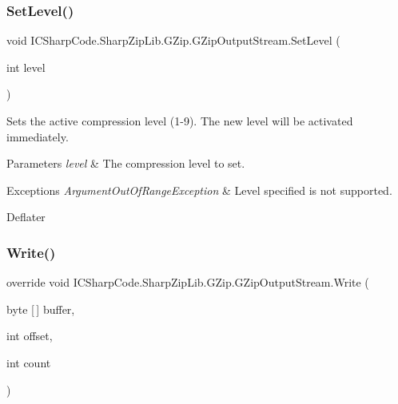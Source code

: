 \subsubsection{\texorpdfstring{Set\+Level()}{SetLevel()}}
{\footnotesize\ttfamily void I\+C\+Sharp\+Code.\+Sharp\+Zip\+Lib.\+G\+Zip.\+G\+Zip\+Output\+Stream.\+Set\+Level (\begin{DoxyParamCaption}\item[{int}]{level }\end{DoxyParamCaption})\hspace{0.3cm}{\ttfamily [inline]}}



Sets the active compression level (1-\/9). The new level will be activated immediately. 


\begin{DoxyParams}{Parameters}
{\em level} & The compression level to set.\\
\hline
\end{DoxyParams}

\begin{DoxyExceptions}{Exceptions}
{\em Argument\+Out\+Of\+Range\+Exception} & Level specified is not supported. \\
\hline
\end{DoxyExceptions}
Deflater \mbox{\label{class_i_c_sharp_code_1_1_sharp_zip_lib_1_1_g_zip_1_1_g_zip_output_stream_ae2563272a7d1c880a2e932985c7a79cd}} 
\subsubsection{\texorpdfstring{Write()}{Write()}}
{\footnotesize\ttfamily override void I\+C\+Sharp\+Code.\+Sharp\+Zip\+Lib.\+G\+Zip.\+G\+Zip\+Output\+Stream.\+Write (\begin{DoxyParamCaption}\item[{byte \mbox{[}$\,$\mbox{]}}]{buffer,  }\item[{int}]{offset,  }\item[{int}]{count }\end{DoxyParamCaption})\hspace{0.3cm}{\ttfamily [inline]}}



